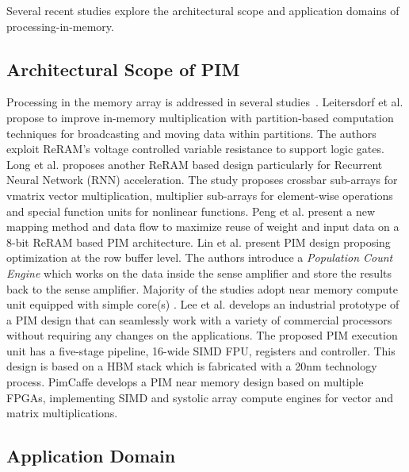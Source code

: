 Several recent studies explore the architectural scope and application domains of processing-in-memory.

\subsection{Architectural Scope of PIM}

Processing in the memory array is addressed in several studies~\cite{03,06,13,15,20,29}. Leitersdorf et al. \cite{13} propose to improve in-memory multiplication with partition-based computation techniques for broadcasting and moving data within partitions. The authors exploit ReRAM's voltage controlled variable resistance to support logic gates. Long et al. \cite{20} proposes another ReRAM based design particularly for Recurrent Neural Network (RNN) acceleration. The study proposes crossbar sub-arrays for vmatrix vector multiplication, multiplier sub-arrays for element-wise operations and special function units for nonlinear functions. Peng et al. \cite{15} present a new mapping method and data flow to maximize reuse of weight and input data on a 8-bit ReRAM based PIM architecture. 
Lin et al. \cite{31} present PIM design proposing optimization at the row buffer level. The authors introduce a \textit{Population Count Engine} which works on the data inside the sense amplifier and store the results back to the sense amplifier. Majority of the studies adopt near memory compute unit equipped with simple core(s) \cite{01,02,05,11,12,17,30,32,33,34,35}. Lee et al. \cite{12} develops an industrial prototype of a PIM design that can seamlessly work with a variety of commercial processors without requiring any changes on the applications. The proposed PIM execution unit has a five-stage pipeline, 16-wide SIMD FPU, registers and controller. This design is based on a HBM stack which is fabricated with a 20nm technology process. PimCaffe \cite{16} develops a PIM near memory design based on multiple FPGAs, implementing SIMD and systolic array compute engines for vector and matrix multiplications.       

\subsection{Application Domain}

